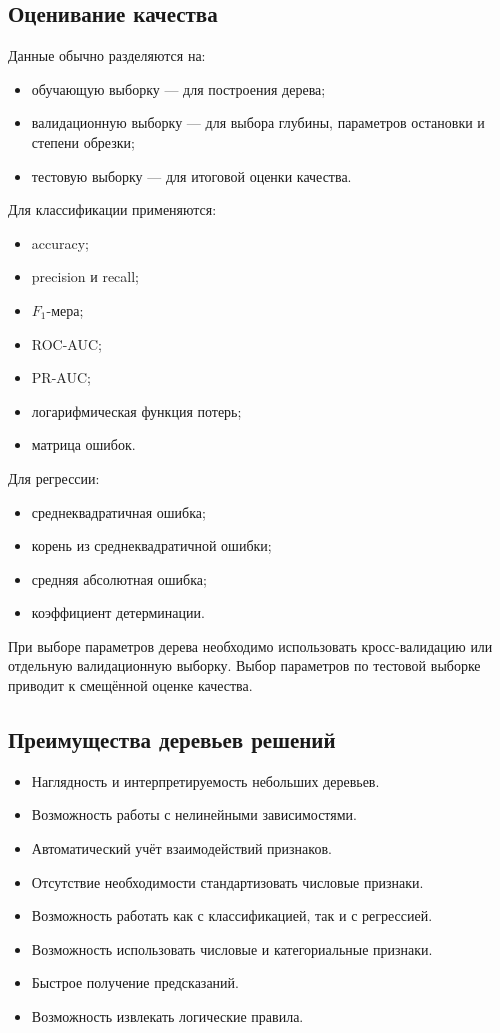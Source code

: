 \documentclass[12pt,a4paper]{article}
\theoremstyle{plain}
\theoremstyle{definition}
\theoremstyle{remark}
\begin{document}
\subsection{Оценивание качества}

Данные обычно разделяются на:
\begin{itemize}
    \item обучающую выборку --- для построения дерева;
    \item валидационную выборку --- для выбора глубины, параметров
    остановки и степени обрезки;
    \item тестовую выборку --- для итоговой оценки качества.
\end{itemize}

Для классификации применяются:
\begin{itemize}
    \item accuracy;
    \item precision и recall;
    \item $F_1$-мера;
    \item ROC-AUC;
    \item PR-AUC;
    \item логарифмическая функция потерь;
    \item матрица ошибок.
\end{itemize}

Для регрессии:
\begin{itemize}
    \item среднеквадратичная ошибка;
    \item корень из среднеквадратичной ошибки;
    \item средняя абсолютная ошибка;
    \item коэффициент детерминации.
\end{itemize}

При выборе параметров дерева необходимо использовать кросс-валидацию
или отдельную валидационную выборку. Выбор параметров по тестовой
выборке приводит к смещённой оценке качества.

\subsection{Преимущества деревьев решений}

\begin{itemize}
    \item Наглядность и интерпретируемость небольших деревьев.
    \item Возможность работы с нелинейными зависимостями.
    \item Автоматический учёт взаимодействий признаков.
    \item Отсутствие необходимости стандартизовать числовые признаки.
    \item Возможность работать как с классификацией, так и с регрессией.
    \item Возможность использовать числовые и категориальные признаки.
    \item Быстрое получение предсказаний.
    \item Возможность извлекать логические правила.
\end{itemize}
\end{document}
